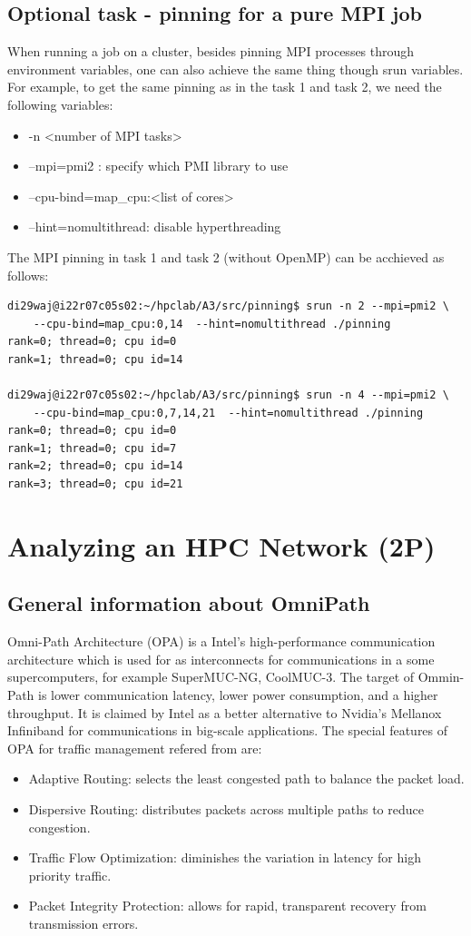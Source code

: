 \documentclass[article]{scrartcl}
\begin{document}
\subsection{Optional task - pinning for a pure MPI job}
When running a job on a cluster, besides pinning MPI processes through environment variables, one can also achieve the same thing though srun variables. For example, to get the same pinning as in the task 1 and task 2, we need the following variables:
\begin{itemize}
  \item -n <number of MPI tasks> 
  \item --mpi=pmi2 : specify which PMI library to use
  \item --cpu-bind=map\_cpu:<list of cores>
  \item --hint=nomultithread: disable hyperthreading
\end{itemize}
The MPI pinning in task 1 and task 2 (without OpenMP) can be acchieved as follows:
\begin{lstlisting}[frame=single]
di29waj@i22r07c05s02:~/hpclab/A3/src/pinning$ srun -n 2 --mpi=pmi2 \
    --cpu-bind=map_cpu:0,14  --hint=nomultithread ./pinning
rank=0; thread=0; cpu id=0
rank=1; thread=0; cpu id=14

di29waj@i22r07c05s02:~/hpclab/A3/src/pinning$ srun -n 4 --mpi=pmi2 \
    --cpu-bind=map_cpu:0,7,14,21  --hint=nomultithread ./pinning
rank=0; thread=0; cpu id=0
rank=1; thread=0; cpu id=7
rank=2; thread=0; cpu id=14
rank=3; thread=0; cpu id=21
\end{lstlisting}

\section{Analyzing an HPC Network (2P)}
\subsection{General information about OmniPath}
Omni-Path Architecture (OPA) is a Intel's high-performance communication architecture which is used for as interconnects for communications in a some supercomputers, for example SuperMUC-NG, CoolMUC-3. The target of Ommin-Path is lower communication latency, lower power consumption, and a higher throughput. It is claimed by Intel as a better alternative to Nvidia's Mellanox Infiniband for communications in big-scale applications. 
The special features of OPA for traffic management refered from \cite{omnipath} are:
\begin{itemize}
  \item Adaptive Routing: selects the least congested path to balance the packet load.
  \item Dispersive Routing: distributes packets across multiple paths to reduce congestion.
  \item Traffic Flow Optimization: diminishes the variation in latency for high priority traffic.
  \item Packet Integrity Protection: allows for rapid, transparent recovery from transmission errors.
\end{itemize}
\end{document}
